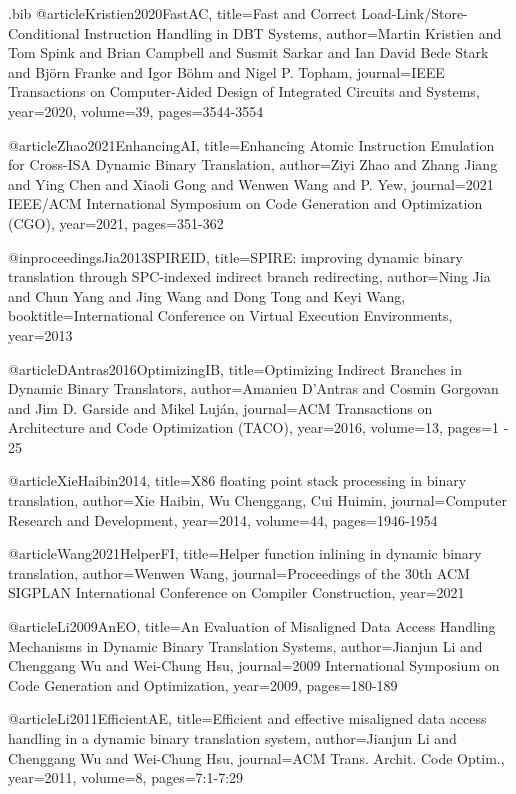 \begin{filecontents}{\jobname.bib}
@article{Kristien2020FastAC,
  title={Fast and Correct Load-Link/Store-Conditional Instruction Handling in DBT Systems},
  author={Martin Kristien and Tom Spink and Brian Campbell and Susmit Sarkar and Ian David Bede Stark and Bj{\"o}rn Franke and Igor B{\"o}hm and Nigel P. Topham},
  journal={IEEE Transactions on Computer-Aided Design of Integrated Circuits and Systems},
  year={2020},
  volume={39},
  pages={3544-3554}
}

@article{Zhao2021EnhancingAI,
  title={Enhancing Atomic Instruction Emulation for Cross-ISA Dynamic Binary Translation},
  author={Ziyi Zhao and Zhang Jiang and Ying Chen and Xiaoli Gong and Wenwen Wang and P. Yew},
  journal={2021 IEEE/ACM International Symposium on Code Generation and Optimization (CGO)},
  year={2021},
  pages={351-362}
}

@inproceedings{Jia2013SPIREID,
  title={SPIRE: improving dynamic binary translation through SPC-indexed indirect branch redirecting},
  author={Ning Jia and Chun Yang and Jing Wang and Dong Tong and Keyi Wang},
  booktitle={International Conference on Virtual Execution Environments},
  year={2013}
}

@article{DAntras2016OptimizingIB,
  title={Optimizing Indirect Branches in Dynamic Binary Translators},
  author={Amanieu D'Antras and Cosmin Gorgovan and Jim D. Garside and Mikel Luj{\'a}n},
  journal={ACM Transactions on Architecture and Code Optimization (TACO)},
  year={2016},
  volume={13},
  pages={1 - 25}
}

@article{XieHaibin2014,
  title={X86 floating point stack processing in binary translation},
  author={Xie Haibin, Wu Chenggang, Cui Huimin},
  journal={Computer Research and Development},
  year={2014},
  volume={44},
  pages={1946-1954}
}

@article{Wang2021HelperFI,
  title={Helper function inlining in dynamic binary translation},
  author={Wenwen Wang},
  journal={Proceedings of the 30th ACM SIGPLAN International Conference on Compiler Construction},
  year={2021}
}

@article{Li2009AnEO,
  title={An Evaluation of Misaligned Data Access Handling Mechanisms in Dynamic Binary Translation Systems},
  author={Jianjun Li and Chenggang Wu and Wei-Chung Hsu},
  journal={2009 International Symposium on Code Generation and Optimization},
  year={2009},
  pages={180-189}
}

@article{Li2011EfficientAE,
  title={Efficient and effective misaligned data access handling in a dynamic binary translation system},
  author={Jianjun Li and Chenggang Wu and Wei-Chung Hsu},
  journal={ACM Trans. Archit. Code Optim.},
  year={2011},
  volume={8},
  pages={7:1-7:29}
}


\end{filecontents}

